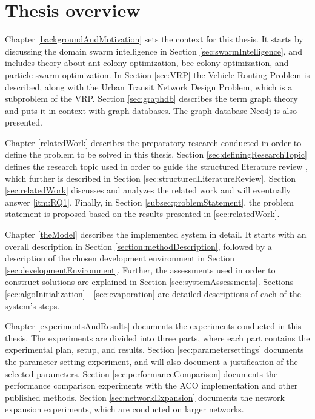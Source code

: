 \section{Thesis overview}



Chapter \ref{backgroundAndMotivation} sets the context for this thesis. It starts by discussing the domain swarm intelligence in Section \ref{sec:swarmIntelligence}, and includes theory about ant colony optimization, bee colony optimization, and particle swarm optimization. In Section \ref{sec:VRP} the Vehicle Routing Problem is described, along with the Urban Transit Network Design Problem, which is a subproblem of the VRP. Section \ref{sec:graphdb} describes the term graph theory and puts it in context with graph databases. The graph database Neo4j is also presented. 

Chapter \ref{relatedWork} describes the preparatory research conducted in order to define the problem to be solved in this thesis. Section \ref{sec:definingResearchTopic} defines the research topic used in order to guide the structured literature review \citep{kofod2014}, which further is described in Section \ref{sec:structuredLiteratureReview}. Section \ref{sec:relatedWork} discusses and analyzes the related work and will eventually answer \ref{itm:RQ1}. Finally, in Section \ref{subsec:problemStatement}, the problem statement is proposed based on the results presented in \ref{sec:relatedWork}.  

Chapter \ref{theModel} describes the implemented system in detail. It starts with an overall description in Section \ref{section:methodDescription}, followed by a description of the chosen development environment in Section \ref{sec:developmentEnvironment}. Further, the assessments used in order to construct solutions are explained in Section \ref{sec:systemAssessments}. Sections \ref{sec:algoInitialization} - \ref{sec:evaporation} are detailed descriptions of each of the system's steps.

Chapter \ref{experimentsAndResults} documents the experiments conducted in this thesis. The experiments are divided into three parts, where each part contains the experimental plan, setup, and results. Section \ref{sec:parametersettings} documents the parameter setting experiment, and will also document a justification of the selected parameters. Section \ref{sec:performanceComparison} documents the performance comparison experiments with the ACO implementation and other published methods. Section \ref{sec:networkExpansion} documents the network expansion experiments, which are conducted on larger networks. 

